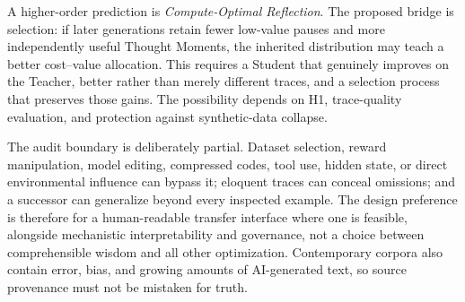 \documentclass[11pt]{article}
\begin{document}
				A higher-order prediction is \emph{Compute-Optimal Reflection}. The
				proposed bridge is selection: if later generations retain fewer low-value
				pauses and more independently useful Thought Moments, the inherited
				distribution may teach a better cost--value allocation. This requires a
				Student that genuinely improves on the Teacher, better rather than merely
				different traces, and a selection process that preserves those gains. The
				possibility depends on H1, trace-quality evaluation, and protection against
				synthetic-data collapse.

			The audit boundary is deliberately partial. Dataset selection, reward manipulation, model editing, compressed codes, tool use, hidden state, or direct environmental influence can bypass it; eloquent traces can conceal omissions; and a successor can generalize beyond every inspected example. The design preference is therefore for a human-readable transfer interface where one is feasible, alongside mechanistic interpretability and governance, not a choice between comprehensible wisdom and all other optimization. Contemporary corpora also contain error, bias, and growing amounts of AI-generated text, so source provenance must not be mistaken for truth.
\end{document}
